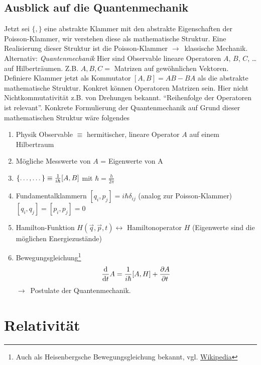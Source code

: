 \documentclass[oneside]{book}
\theoremstyle{definition}
\newcommand{\conseq}{$\rightarrow$~}
\renewcommand{\d}{\mathrm d}
\newcommand{\dd}[1]{\frac{\d}{\d #1}}
\newcommand{\ffpartial}[2]{\frac{\partial #1}{\partial #2}}
\begin{document}
\section{Ausblick auf die Quantenmechanik}
Jetzt sei $\{,\}$ eine abstrakte Klammer mit den abstrakte Eigenschaften der Poisson-Klammer, wir verstehen diese als mathematische Struktur.
Eine Realisierung dieser Struktur ist die Poisson-Klammer \conseq klassische Mechanik.
Alternativ: \textit{Quantenmechanik}
Hier sind Observable lineare Operatoren $A$, $B$, $C$, \dots auf Hilberträumen. Z.B. $A,B,C = $ Matrizen auf gewöhnlichen Vektoren. Definiere Klammer jetzt als Kommutator $[A,B] = AB - BA$
als die abstrakte mathematische Struktur. Konkret können Operatoren Matrizen sein. Hier nicht Nichtkommutativität z.B. von Drehungen bekannt. "`Reihenfolge der Operatoren ist relevant"'.
Konkrete Formulierung der Quantenmechanik auf Grund dieser mathematischen Struktur wäre folgendes
\begin{enumerate}
	\item Physik Observable $\equiv$ hermitischer, lineare Operator $A$ auf einem Hilbertraum
	\item Mögliche Messwerte von $A$ = Eigenwerte von A
	\item $\{\dots, \dots\} \equiv \frac{1}{i \hbar} [A, B]$ mit $\hbar = \frac{h}{2 \pi}$
	\item Fundamentalklammern
	$[q_i, p_j] = i \hbar \delta_{ij}$ (analog zur Poisson-Klammer)\\
	$[q_i, q_j] = [p_i, p_j] = 0$
	\item Hamilton-Funktion $H(\vec{q}, \vec{p}, t) \leftrightarrow $ Hamiltonoperator $H$ (Eigenwerte sind die möglichen Energiezustände)
	\item Bewegungsgleichung\footnote{Auch als Heisenbergsche Bewegungsgleichung bekannt, vgl. \href{https://de.wikipedia.org/wiki/Heisenbergsche_Bewegungsgleichung}{Wikipedia}}
	$$\dd t A = \fihbar [A, H] + \ffpartial{A}{t}$$
	\conseq Postulate der Quantenmechanik.
\end{enumerate}



\chapter{Relativität}
\end{document}
